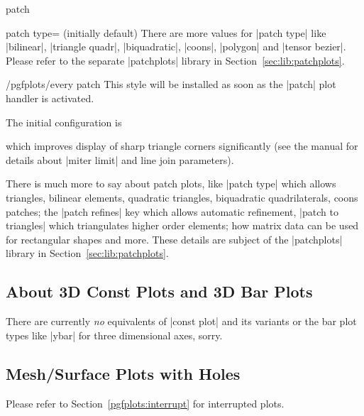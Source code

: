 {\begin{plottype}[/pgfplots]{patch}
\begin{pgfplotskey}{patch type= (initially default)}
        There are more values for |patch type| like |bilinear|,
        |triangle quadr|, |biquadratic|, |coons|, |polygon| and
        |tensor bezier|. Please refer to the separate |patchplots| library in
        Section~\ref{sec:lib:patchplots}.
    \end{pgfplotskey}

    \begin{stylekey}{/pgfplots/every patch}
        This style will be installed as soon as the |patch| plot handler is
        activated.

        The initial configuration is
\begin{codeexample}
\end{codeexample}
        \noindent which improves display of sharp triangle corners significantly
        (see the \Tikz{} manual for details about |miter limit| and line join
        parameters).
    \end{stylekey}

    There is much more to say about patch plots, like |patch type| which allows
    triangles, bilinear elements, quadratic triangles, biquadratic
    quadrilaterals, coons patches; the |patch refines| key which allows
    automatic refinement, |patch to triangles| which triangulates higher order
    elements; how matrix data can be used for rectangular shapes and more.
    These details are subject of the |patchplots| library in
    Section~\ref{sec:lib:patchplots}.
\end{plottype}


\subsection{About 3D Const Plots and 3D Bar Plots}

There are currently \emph{no} equivalents of |const plot| and its variants or
the bar plot types like |ybar| for three dimensional axes, sorry.


\subsection{Mesh/Surface Plots with Holes}

Please refer to Section~\ref{pgfplots:interrupt} for interrupted plots.

}
